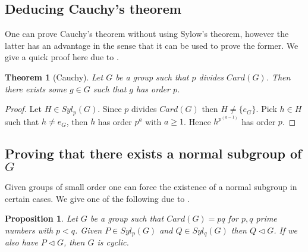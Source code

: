 \documentclass{article}
\theoremstyle{definition}
\theoremstyle{plain}
\newtheorem{proposition}[subsubsection]{Proposition}
\theoremstyle{plain}
\theoremstyle{plain}
\theoremstyle{plain}
\theoremstyle{definition}
\theoremstyle{plain}
\newtheorem{thmeng}[subsubsection]{Theorem}
\theoremstyle{plain}
\begin{document}
\subsection{Deducing Cauchy's theorem}

One can prove Cauchy's theorem without using Sylow's theorem, however the latter has an advantage in the sense that it can be used to prove the former. We give a quick proof here due to \cite[p. ~12]{serre1979ens}.

\begin{thmeng}[Cauchy]
	Let \( G \) be a group such that \( p \) divides \( Card(G) \). Then there exists some \( g \in G \) such that \( g \) has order \( p \).
\end{thmeng}

\begin{proof}
	Let \( H \in Syl_p(G) \). Since \( p \) divides \( Card(G) \) then \( H \neq \{e_G\} \). Pick \( h \in H \) such that \( h \neq e_G \), then \( h \) has order \( p^{a} \) with \( a \geq 1 \). Hence \( h^{p^{(a-1)}} \) has order \( p \).
\end{proof}

\subsection{Proving that there exists a normal subgroup of \ensuremath{G}}

Given groups of small order one can force the existence of a normal subgroup in certain cases. We give one of the following due to \cite[p. ~143]{dummit2003abstract}.

\begin{proposition}\label{primes}
	Let \( G \) be a group such that \( Card(G) = pq \) for \( p,q \) prime numbers with \( p < q \). Given \( P \in Syl_p(G) \) and \( Q \in Syl_q(G) \) then \( Q \triangleleft G \). If we also have \( P \triangleleft G \), then \( G \) is cyclic.
\end{proposition}
\end{document}
